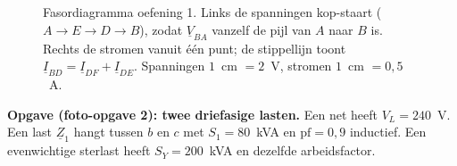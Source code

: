 \documentclass[a4paper,11pt]{article}
\begin{document}
\begin{oefenblok}
\begin{figure}[H]
        \caption{Fasordiagramma oefening 1. Links de spanningen kop-staart ($A\to E\to D\to B$),
        zodat $\underline{V}_{BA}$ vanzelf de pijl van $A$ naar $B$ is. Rechts de stromen vanuit
        \'e\'en punt; de stippellijn toont
        $\underline{I}_{BD} = \underline{I}_{DF} + \underline{I}_{DE}$. Spanningen $1$~cm $=2$~V,
        stromen $1$~cm $=0{,}5$~A.}
    \end{figure}\FloatBarrier
\end{oefenblok}

\textbf{Opgave (foto-opgave 2): twee driefasige lasten.}
Een net heeft $V_L=240$~V. Een last $\underline{Z}_1$ hangt tussen $b$ en $c$ met
$S_1=80$~kVA en $\mathrm{pf}=0{,}9$ inductief. Een evenwichtige sterlast heeft
$S_Y=200$~kVA en dezelfde arbeidsfactor.
\end{document}
